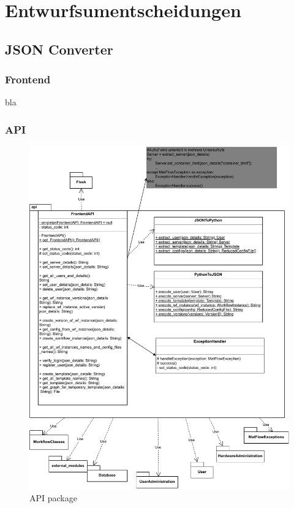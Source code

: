 \section{Entwurfsumentscheidungen}

\subsection{JSON Converter}
    \subsubsection{Frontend}
    bla
    \subsubsection{API}
        \begin{figure}[H]
            \label{API}
            \centerline{\includegraphics[scale=0.5]{res/api.drawio.pdf}}
            \caption{API package}
        \end{figure}
